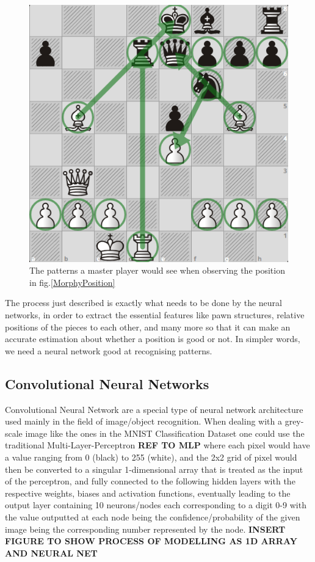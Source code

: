 \begin{figure}[H]
    \centering
    \includegraphics[scale=0.45]{images/MorphyAnotated.png}
    \caption{The patterns a master player would see when observing the position in fig.\ref{MorphyPosition}}
    \label{MorphyAnotated}
\end{figure}

The process just described is exactly what needs to be done by the neural networks, in order to extract the essential features like pawn structures, relative positions of the pieces to each other, and many more so that it can make an accurate estimation about whether a position is good or not. In simpler words, we need a neural network good at recognising patterns.

\subsection{Convolutional Neural Networks}

Convolutional Neural Network are a special type of neural network architecture used mainly in the field of image/object recognition. When dealing with a grey-scale image like the ones in the MNIST Classification Dataset \cite{MNIST} one could use the traditional Multi-Layer-Perceptron \textbf{REF TO MLP} where each pixel would have a value ranging from 0 (black) to 255 (white), and the 2x2 grid of pixel would then be converted to a singular 1-dimensional array that is treated as the input of the perceptron, and fully connected to the following hidden layers with the respective weights, biases and activation functions, eventually leading to the output layer containing 10 neurons/nodes each corresponding to a digit 0-9 with the value outputted at each node being the confidence/probability of the given image being the corresponding number represented by the node. \textbf{INSERT FIGURE TO SHOW PROCESS OF MODELLING AS 1D ARRAY AND NEURAL NET}

